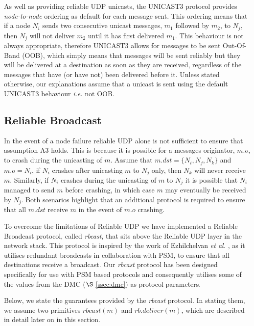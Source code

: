     As well as providing reliable UDP unicasts, the \textsf{UNICAST3} protocol provides \emph{node-to-node} ordering as default for each message sent.  This ordering means that if a node $N_i$ sends two consecutive unicast messages, $m_1$ followed by $m_2$, to $N_j$, then $N_j$ will not deliver $m_2$ until it has first delivered $m_1$.  This behaviour is not always appropriate, therefore \textsf{UNICAST3} allows for messages to be sent Out-Of-Band (OOB), which simply means that messages will be sent reliably but they will be delivered at a destination as soon as they are received, regardless of the messages that have (or have not) been delivered before it.  Unless stated otherwise, our explanations assume that a unicast is sent using the default \textsf{UNICAST3} behaviour \emph{i.e.} not OOB.  
    
    \subsection{Reliable Broadcast}\label{ssec:rbcast}
    In the event of a node failure reliable UDP alone is not sufficient to ensure that assumption A3 holds.  This is because it is possible for a messages originator, $m.o$, to crash during the unicasting of $m$.  Assume that $m.dst = \{N_i, N_j, N_k\}$ and $m.o = N_i$, if $N_i$ crashes after unicasting $m$ to $N_j$ only, then $N_k$ will never receive $m$.  Similarly, if $N_i$ crashes during the unicasting of $m$ to $N_j$ it is possible that $N_i$ managed to send $m$ before crashing, in which case $m$ may eventually be received by $N_j$.  Both scenarios highlight that an additional protocol is required to ensure that all $m.dst$ receive $m$ in the event of $m.o$ crashing.  
    
    To overcome the limitations of Reliable UDP we have implemented a Reliable Broadcast protocol, called  \emph{rbcast}, that sits above the Reliable UDP layer in the network stack.  This protocol is inspired by the work of  Ezhilchelvan \emph{et al.} \citep{ezhilchelvan2011near}, as it utilises redundant broadcasts in collaboration with PSM, to ensure that all destinations receive a broadcast.  Our \emph{rbcast} protocol has been designed specifically for use with PSM based protocols and consequently utilises some of the values from the DMC ($\S$ \ref{ssec:dmc}) as protocol parameters.  
    
    Below, we state the guarantees provided by the \emph{rbcast} protocol.  In stating them, we assume two primitives $rbcast(m)$ and $rb.deliver(m)$, which are described in detail later on in this section.
    
